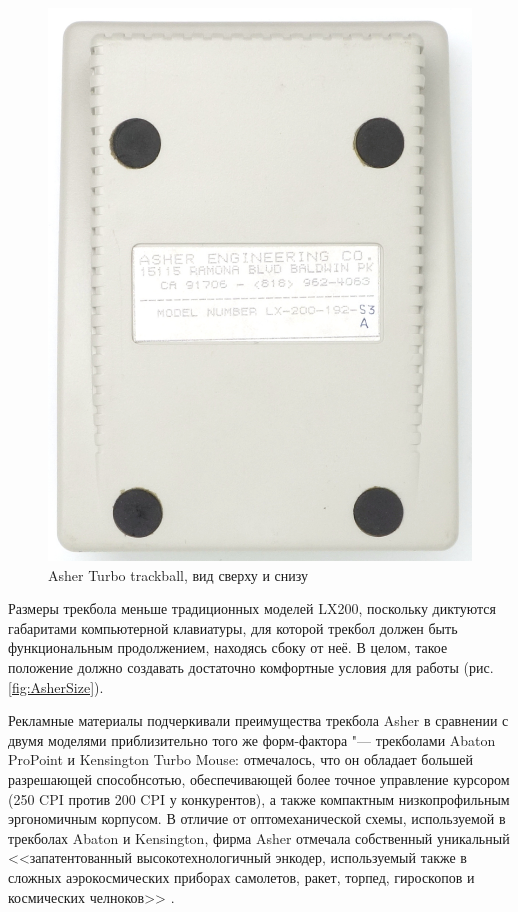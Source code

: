 \documentclass[11pt, a4paper]{article}
\begin{document}
\begin{figure}[h]
    \includegraphics[scale=0.6]{1988_asher_turbo_trackball/bottom_15.jpg}
    \caption{Asher Turbo trackball, вид сверху и снизу}
    \label{fig:AsherTopBottom}
\end{figure}

Размеры трекбола меньше традиционных моделей LX200, поскольку диктуются габаритами компьютерной клавиатуры, для которой трекбол должен быть функциональным продолжением, находясь сбоку от неё. В целом, такое положение должно создавать достаточно комфортные условия для работы (рис. \ref{fig:AsherSize}).

Рекламные материалы подчеркивали преимущества трекбола Asher в сравнении с двумя моделями приблизительно того же форм-фактора "--- трекболами Abaton ProPoint и Kensington Turbo Mouse: отмечалось, что он обладает большей разрешающей способнсотью, обеспечивающей более точное управление курсором (250 CPI против 200 CPI у конкурентов), а также компактным низкопрофильным эргономичным корпусом. В отличие от оптомеханической схемы, используемой в трекболах Abaton и Kensington, фирма Asher отмечала собственный уникальный <<запатентованный высокотехнологичный энкодер, используемый также в сложных аэрокосмических приборах самолетов, ракет, торпед, гироскопов и космических челноков>> \cite{turbo}.
\end{document}
